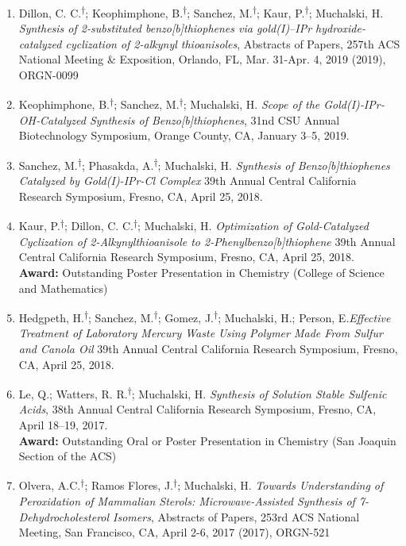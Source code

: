 \documentclass[11pt,letterpaper]{article}
\begin{document}
\begin{enumerate}[itemindent=0pt]
    \item{Dillon, C. C.\textsuperscript{$\dagger$}; Keophimphone, B.\textsuperscript{$\dagger$}; Sanchez, M.\textsuperscript{$\dagger$}; Kaur, P.\textsuperscript{$\dagger$}; Muchalski, H. \emph{ Synthesis of 2-substituted benzo[b]thiophenes via gold(I)--IPr hydroxide- catalyzed cyclization of 2-alkynyl thioanisoles}, Abstracts of Papers, 257th ACS National Meeting \& Exposition, Orlando, FL, Mar. 31-Apr. 4, 2019 (2019), ORGN-0099
}
  
    \item{Keophimphone, B.\textsuperscript{$\dagger$}; Sanchez, M.\textsuperscript{$\dagger$}; Muchalski, H. \emph{Scope of the Gold(I)‐IPr‐OH‐Catalyzed Synthesis of Benzo[b]thiophenes}, 31nd CSU Annual Biotechnology Symposium, Orange County, CA, January 3--5, 2019.
}
  
    \item{Sanchez, M.\textsuperscript{$\dagger$}; Phasakda, A.\textsuperscript{$\dagger$}; Muchalski, H. \emph{Synthesis of Benzo[b]thiophenes Catalyzed by Gold(I)-IPr-Cl Complex} 39th Annual Central California Research Symposium, Fresno, CA, April 25, 2018.
}
  
    \item{Kaur, P.\textsuperscript{$\dagger$}; Dillon, C. C.\textsuperscript{$\dagger$}; Muchalski, H. \emph{Optimization of Gold-Catalyzed Cyclization of 2-Alkynylthioanisole to 2-Phenylbenzo[b]thiophene} 39th Annual Central California Research Symposium, Fresno, CA, April 25, 2018.\\
\textbf{Award:} Outstanding Poster Presentation in Chemistry (College of Science and Mathematics)
}

    \item{Hedgpeth, H.\textsuperscript{$\dagger$}; Sanchez, M.\textsuperscript{$\dagger$}; Gomez, J.\textsuperscript{$\dagger$}; Muchalski, H.; Person, E.\emph{Effective Treatment of Laboratory Mercury Waste Using Polymer Made From Sulfur and Canola Oil} 39th Annual Central California Research Symposium, Fresno, CA, April 25, 2018.
}
  
    \item{Le, Q.; Watters, R. R.\textsuperscript{$\dagger$}; Muchalski, H. \emph{Synthesis of Solution Stable Sulfenic Acids}, 38th Annual Central California Research Symposium, Fresno, CA, April 18--19, 2017.\\
\textbf{Award:} Outstanding Oral or Poster Presentation in Chemistry (San Joaquin Section of the ACS)
}

    \item{Olvera, A.C.\textsuperscript{$\dagger$}; Ramos Flores, J.\textsuperscript{$\dagger$}; Muchalski, H. \emph{Towards Understanding of Peroxidation of Mammalian Sterols: Microwave-Assisted Synthesis of 7-Dehydrocholesterol Isomers}, Abstracts of Papers, 253rd ACS National Meeting, San Francisco, CA, April 2-6, 2017 (2017), ORGN-521}



\end{enumerate}
\end{document}
